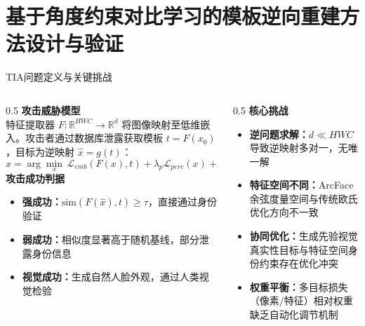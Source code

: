 \documentclass[aspectratio=169,12pt]{beamer}
\renewcommand{\textbf}[1]{\textcolor{hitblue}{\bfseries #1}}
\newcommand{\important}[1]{\textcolor{hitgray}{\textbf{#1}}}
\begin{document}
\section{基于角度约束对比学习的模板逆向重建方法设计与验证}

\begin{frame}{TIA问题定义与关键挑战}
\footnotesize
\begin{columns}[T]
\begin{column}{0.5\textwidth}
\textbf{攻击威胁模型}\\[2pt]
特征提取器 $F\!:\mathbb{R}^{HWC}\!\to\!\mathbb{R}^d$ 将图像映射至低维嵌入。攻击者通过数据库泄露获取模板 $t=F(x_0)$，目标为逆映射 $\hat{x}=g(t)$：
\vspace{-4pt}
{\scriptsize\begin{equation*}
\hat{x}=\arg\min_x\,\mathcal{L}_{emb}(F(x),t)+\lambda_p\mathcal{L}_{perc}(x)+\lambda_r R(x),\;\text{s.t.}\;\hat{x}\!\in\!\mathcal{M}_{nat}
\end{equation*}}\vspace{-4pt}
\textbf{攻击成功判据}
\begin{itemize}\setlength{\itemsep}{1pt}
  \item \important{强成功：}$\mathrm{sim}(F(\hat{x}),t)\geq\tau$，直接通过身份验证
  \item \important{弱成功：}相似度显著高于随机基线，部分泄露身份信息
  \item \important{视觉成功：}生成自然人脸外观，通过人类视觉检验
\end{itemize}
\end{column}
\begin{column}{0.5\textwidth}
\textbf{核心挑战}
\begin{itemize}\setlength{\itemsep}{2pt}
  \item \important{逆问题求解：}$d\!\ll\!HWC$ 导致逆映射多对一，无唯一解
  \item \important{特征空间不同：}ArcFace余弦度量空间与传统欧氏优化方向不一致
  \item \important{协同优化：}生成先验视觉真实性目标与特征空间身份约束存在优化冲突
  \item \important{权重平衡：}多目标损失（像素/特征）相对权重缺乏自动化调节机制
\end{itemize}
\end{column}
\end{columns}
\end{frame} %
\end{document}
